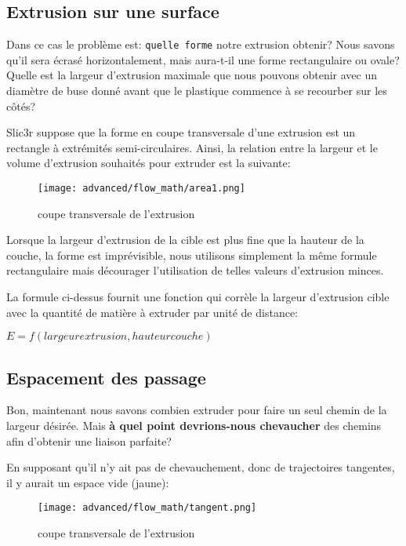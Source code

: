 \subsection{Extrusion sur une surface} %

Dans ce cas le probl\`eme est: \texttt{quelle forme} notre extrusion obtenir? Nous savons qu'il sera \'ecras\'e horizontalement, mais aura-t-il une forme rectangulaire ou ovale? Quelle est la largeur d'extrusion maximale que nous pouvons obtenir avec un diam\`etre de buse donn\'e avant que le plastique commence \`a se recourber sur les côt\'es?

Slic3r suppose que la forme en coupe transversale d'une extrusion est un rectangle \`a extr\'emit\'es semi-circulaires. Ainsi, la relation entre la largeur et le volume d'extrusion souhait\'es pour extruder est la suivante:

\begin{figure}[H]
\centering
\texttt{[image: advanced/flow\_math/area1.png]}
\caption{coupe transversale de l'extrusion}
\label{fig:area1}
\end{figure}

Lorsque la largeur d'extrusion de la cible est plus fine que la hauteur de la couche, la forme est impr\'evisible, nous utilisons simplement la même formule rectangulaire mais d\'ecourager l'utilisation de telles valeurs d'extrusion minces.

La formule ci-dessus fournit une fonction qui corr\`ele la largeur d'extrusion cible avec la quantit\'e de mati\`ere \`a extruder par unit\'e de distance:

$E = f(largeur extrusion, hauteur couche)$

\subsection{Espacement des passage} %

Bon, maintenant nous savons combien extruder pour faire un seul chemin de la largeur d\'esir\'ee. Mais \textbf{\`a quel point devrions-nous chevaucher} des chemins afin d'obtenir une liaison parfaite?

En supposant qu'il n'y ait pas de chevauchement, donc de trajectoires tangentes, il y aurait un espace vide (jaune):

\begin{figure}[H]
\centering
\texttt{[image: advanced/flow\_math/tangent.png]}
\caption{coupe transversale de l'extrusion}
\label{fig:tangent}
\end{figure}

